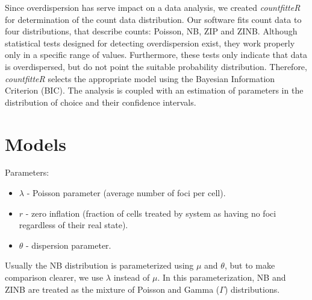 Since overdispersion has serve impact on a data analysis, we created \emph{countfitteR} for determination of the count data distribution. Our software fits count data to four distributions, that describe counts: Poisson, NB, ZIP and ZINB. Although statistical tests designed for detecting overdispersion exist, they work properly only in a specific range of values. Furthermore, these tests only indicate that data is overdispersed, but do not point the suitable probability distribution. Therefore, \emph{countfitteR} selects the appropriate model using the Bayesian Information Criterion (BIC). The analysis is coupled with an estimation of parameters in the distribution of choice and their confidence intervals.  


\section{Models}

Parameters:
\begin{itemize}
\item $\lambda$ - Poisson parameter (average number of foci per cell). 
\item $r$ - zero inflation (fraction of cells treated by system as having no foci regardless of their real state).
\item $\theta$ - dispersion parameter.
\end{itemize}
  
Usually the NB distribution is parameterized using $\mu$ and $\theta$, but to make comparison clearer, we use $\lambda$ instead of $\mu$. In this parameterization, NB and ZINB are treated as the mixture of Poisson and Gamma ($\Gamma$) distributions.  

